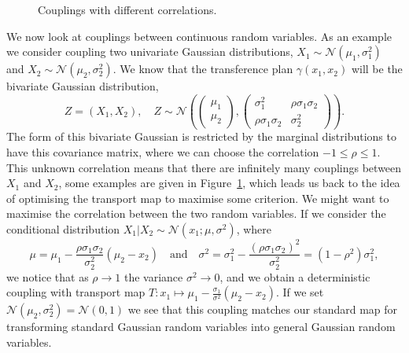 \documentclass[final]{siamltex}
\begin{document}
\begin{figure}
\centering
{}
\caption{Couplings with different correlations.}
\label{fig:cts_couplings}
\end{figure}

We now look at couplings between continuous random variables. As an example we consider coupling two
univariate Gaussian distributions, $X_1 \sim \mathcal{N}(\mu_1, \sigma^2_1)$ and $X_2 \sim
\mathcal{N}(\mu_2, \sigma^2_2)$. We know that the transference plan $\gamma(x_1, x_2)$ will be the
bivariate Gaussian distribution,
\[
	Z = (X_1, X_2), \quad Z \sim \mathcal{N}\left(\begin{pmatrix}\mu_1\\\mu_2\end{pmatrix},
		\begin{pmatrix} \sigma^2_1 & \rho\sigma_1\sigma_2 \\ \rho\sigma_1\sigma_2 & \sigma^2_2
		\end{pmatrix}\right).
\]
The form of this bivariate Gaussian is restricted by the marginal distributions to have this
covariance matrix, where we can choose the correlation $-1 \leq \rho \leq 1$. This unknown
correlation means that there are infinitely many couplings between $X_1$ and $X_2$, some examples
are given in Figure~\ref{fig:cts_couplings}, which leads us back to the idea of optimising the
transport map to maximise some criterion. We might want to maximise the correlation between the two
random variables. If we consider the conditional distribution $X_1|X_2 \sim \mathcal{N}(x_1; \mu,
\sigma^2)$, where
\[
	\mu = \mu_1 - \frac{\rho\sigma_1\sigma_2}{\sigma^2_2}(\mu_2 - x_2) \quad \text{and} \quad \sigma^2 =
		\sigma^2_1 - \frac{(\rho\sigma_1\sigma_2)^2}{\sigma_2^2} = (1-\rho^2)\sigma_1^2,
\]
we notice that as $\rho\rightarrow 1$ the variance $\sigma^2 \rightarrow 0$, and we obtain a
deterministic coupling with transport map $T\colon x_1 \mapsto \mu_1 -
\frac{\sigma_1}{\sigma^2}(\mu_2 - x_2)$. If we set $\mathcal{N}(\mu_2, \sigma^2_2) = \mathcal{N}(0,
1)$ we see that this coupling matches our standard map for transforming standard Gaussian random
variables into general Gaussian random variables.
\end{document}
